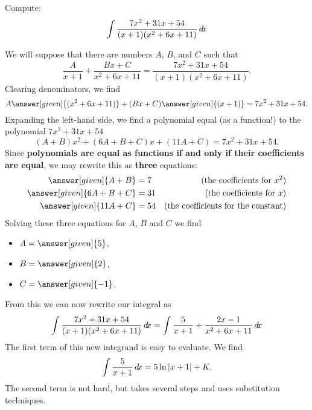 \documentclass{ximera}
\begin{document}
\begin{example}
  Compute:
  \[
  \int\frac{7x^2+31x+54}{(x+1)(x^2+6x+11)}\mathop{}\!d\! x
  \]
  \begin{explanation}
    We will suppose that there are numbers $A$, $B$, and $C$ such that
    \[
    \frac{A}{x+1} + \frac{Bx+C}{x^2+6x+11} = \frac{7x^2+31x+54}{(x+1)(x^2+6x+11)}.
    \]
    Clearing denominators, we find
    \[
    A\answer[given]{(x^2+6x+11)} + (Bx+C)\answer[given]{(x+1)} = 7x^2+31x+54.
    \]
    Expanding the left-hand side, we find a polynomial equal (as a
    function!) to the polynomial $7x^2+31x+54$
    \[
    (A+B)x^2 + (6A+B+C)x + (11A+C) = 7x^2+31x+54.
    \]
    Since \textbf{polynomials are equal as functions if and only if
      their coefficients are equal}, we may rewrite this as
    \textbf{three} equations:
    \begin{align*}
      \answer[given]{A+B} &= 7 &\text{(the coefficients for $x^2$)}\\
      \answer[given]{6A+B+C} &= 31 &\text{(the coefficients for $x$)}\\
      \answer[given]{11A+C} &= 54 &\text{(the coefficients for the constant)}
    \end{align*}
    Solving these three equations for $A$, $B$ and $C$ we find
    \begin{itemize}
    \item $A = \answer[given]{5}$,
    \item $B = \answer[given]{2}$,
    \item $C = \answer[given]{-1}$.
    \end{itemize}
    From this we can now rewrite our integral as
    \[
    \int\frac{7x^2+31x+54}{(x+1)(x^2+6x+11)}\mathop{}\!d\! x = \int\frac{5}{x+1} + \frac{2x-1}{x^2+6x+11} \mathop{}\!d\! x\\
    \]
    The first term of this new integrand is easy to evaluate. We find
    \[
    \int \frac{5}{x+1} \mathop{}\!d\! x = 5\ln|x+1|+K.
    \]
    The second term is not hard, but takes several steps and uses
    substitution techniques.


\end{explanation}
\end{example}
\end{document}
